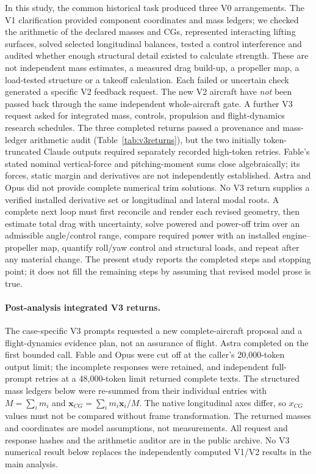\documentclass[10pt,letterpaper]{article}
\begin{document}
In this study, the common historical task produced three V0 arrangements. The V1 clarification provided component coordinates and mass ledgers; we checked the arithmetic of the declared masses and CGs, represented interacting lifting surfaces, solved selected longitudinal balances, tested a control interference and audited whether enough structural detail existed to calculate strength. These are not independent mass estimates, a measured drag build-up, a propeller map, a load-tested structure or a takeoff calculation. Each failed or uncertain check generated a specific V2 feedback request. The new V2 aircraft have \emph{not} been passed back through the same independent whole-aircraft gate. A further V3 request asked for integrated mass, controls, propulsion and flight-dynamics research schedules. The three completed returns passed a provenance and mass-ledger arithmetic audit (Table~\ref{tab:v3returns}), but the two initially token-truncated Claude outputs required separately recorded high-token retries. Fable's stated nominal vertical-force and pitching-moment sums close algebraically; its forces, static margin and derivatives are not independently established. Astra and Opus did not provide complete numerical trim solutions. No V3 return supplies a verified installed derivative set or longitudinal and lateral modal roots. A complete next loop must first reconcile and render each revised geometry, then estimate total drag with uncertainty, solve powered and power-off trim over an admissible angle/control range, compare required power with an installed engine--propeller map, quantify roll/yaw control and structural loads, and repeat after any material change. The present study reports the completed steps and stopping point; it does not fill the remaining steps by assuming that revised model prose is true.

\paragraph{Post-analysis integrated V3 returns.}
The case-specific V3 prompts requested a new complete-aircraft proposal and a
flight-dynamics evidence plan, not an assurance of flight. Astra completed on
the first bounded call. Fable and Opus were cut off at the caller's 20,000-token
output limit; the incomplete responses were retained, and independent
full-prompt retries at a 48,000-token limit returned complete texts. The
structured mass ledgers below were re-summed from their individual entries
with $M=\sum_i m_i$ and $\mathbf{x}_{CG}=\sum_i m_i\mathbf{x}_i/M$.
The native longitudinal axes differ, so $x_{CG}$ values must not be compared
without frame transformation. The returned masses and coordinates are
model assumptions, not measurements. All request and response hashes and the
arithmetic auditor are in the public archive. No V3 numerical result below
replaces the independently computed V1/V2 results in the main analysis.
\end{document}

